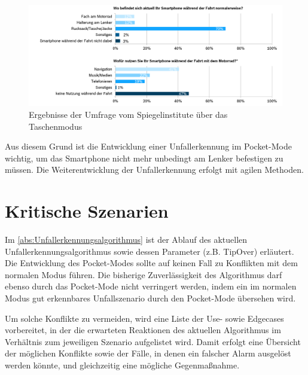 

\begin{figure}[htpb]
	\centering
	\includegraphics[width=\textwidth]{Bilder/SpiegelUmfragePocketMode.png}
	\caption{Ergebnisse der Umfrage vom Spiegelinstitute über das Taschenmodus}
	\label{fig:CalimotoUmfragePocketMode}
\end{figure}

Aus diesem Grund ist die Entwicklung einer Unfallerkennung im Pocket-Mode wichtig, um das Smartphone nicht mehr unbedingt am Lenker befestigen zu müssen. Die Weiterentwicklung der Unfallerkennung erfolgt mit agilen Methoden.

\section{Kritische Szenarien}
Im \autoref{abs:Unfallerkennungsalgorithmus} ist der Ablauf des aktuellen Unfallerkennungsalgorithmus sowie dessen Parameter (z.B. TipOver) erläutert. Die Entwicklung des Pocket-Modes sollte auf keinen Fall zu Konflikten mit dem normalen Modus führen. Die bisherige Zuverlässigkeit des Algorithmus darf ebenso durch das Pocket-Mode nicht verringert werden, indem ein im normalen Modus gut erkennbares Unfallszenario durch den Pocket-Mode übersehen wird.

Um solche Konflikte zu vermeiden, wird eine Liste der Use- sowie Edgecases vorbereitet, in der die erwarteten Reaktionen des aktuellen Algorithmus im Verhältnis zum jeweiligen Szenario aufgelistet wird. Damit erfolgt eine Übersicht der möglichen Konflikte sowie der Fälle, in denen ein falscher Alarm ausgelöst werden könnte, und gleichzeitig eine mögliche Gegenmaßnahme.

